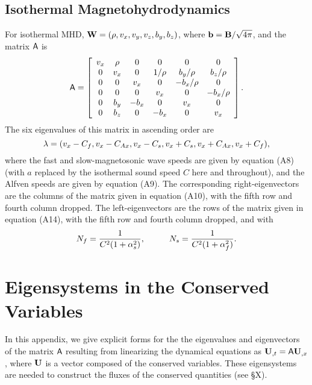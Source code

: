 \subsection{Isothermal Magnetohydrodynamics}

For isothermal MHD, ${\bf W} = (\rho, v_{x}, v_{y}, v_{z}, b_{y}, b_{z})$,
where ${\bf b} = {\bf B}/\sqrt{4\pi}$, and the matrix ${\sf A}$ is
\begin{equation}
{\sf A} = \left[ \begin{array}{ccccccc}
v_x & \rho & 0 & 0 & 0 & 0 \\
0 & v_x & 0 & 1/\rho & b_y/\rho & b_z/\rho \\
0 & 0 & v_x & 0 & -b_x/\rho & 0 \\
0 & 0 & 0 & v_x & 0 & -b_x/\rho \\
0 & b_y & -b_x & 0 & v_x & 0 \\
0 & b_z & 0 & -b_x & 0 & v_x  \end{array} \right] .
\end{equation}
The six eigenvalues of this matrix in ascending order are
\begin{equation}
{\bf \lambda} = (v_{x}-C_{f}, v_{x}-C_{Ax}, v_{x}-C_{s}, 
v_{x}+C_{s}, v_{x}+C_{Ax}, v_{x}+C_{f}), 
\end{equation}
where the fast and slow-magnetosonic wave speeds are given by equation
(A8) (with $a$ replaced by the isothermal sound speed $C$ here and throughout),
and the Alfven speeds are given by equation (A9).  The
corresponding right-eigenvectors are the columns of the matrix given in
equation (A10), with the fifth row and fourth column dropped.  The
left-eigenvectors are the rows of the matrix given in equation (A14),
with the fifth row and fourth column dropped, and with
\begin{equation}
N_{f} = \frac{1}{C^{2}(1+\alpha_{s}^{2})}, \hspace*{1cm}
N_{s} = \frac{1}{C^{2}(1+\alpha_{f}^{2})}.
\end{equation}

\setcounter{equation}{0}
\section{Eigensystems in the Conserved Variables}

In this appendix, we give explicit forms for the the eigenvalues and
eigenvectors of the matrix ${\sf A}$ resulting from linearizing the
dynamical equations as ${\bf U}_{,t} = {\sf A}{\bf U}_{,x}$, where
${\bf U}$ is a vector composed of the conserved variables.  These
eigensystems are needed to construct the fluxes of the conserved
quantities (see \S X).

